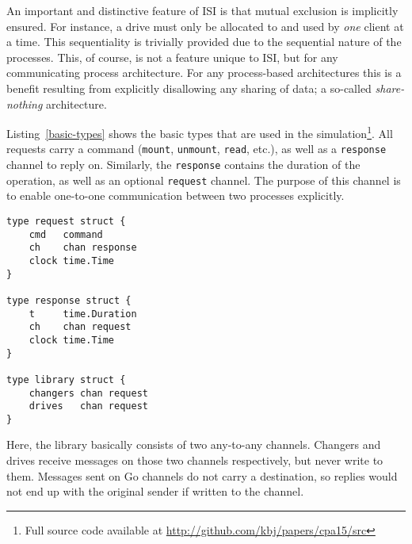 An important and distinctive feature of ISI is that mutual exclusion is
implicitly ensured. For instance, a drive must only be allocated to and used by
\emph{one} client at a time. This sequentiality is trivially provided due to
the sequential nature of the processes. This, of course, is not a feature
unique to ISI, but for any communicating process architecture. For any
process-based architectures this is a benefit resulting from explicitly
disallowing any sharing of data; a so-called
\emph{share-nothing} architecture.



Listing~\ref{basic-types} shows the basic types that are used in the
simulation\footnote{Full source code available at
\url{http://github.com/kbj/papers/cpa15/src}}. All requests carry a command
(\verb|mount|,
\verb|unmount|, \verb|read|, etc.), as well as a \verb|response|
channel to reply on. Similarly, the \verb|response| contains the duration
of the operation, as well as an optional \verb|request| channel. The
purpose of this channel is to	enable one-to-one communication between two
processes explicitly.

\begin{lstlisting}[caption={Basic types for tape simulation}, label=basic-types]
type request struct {
    cmd   command
    ch    chan response
    clock time.Time
}

type response struct {
    t     time.Duration
    ch    chan request
    clock time.Time
}

type library struct {
    changers chan request
    drives   chan request
}
\end{lstlisting}

Here, the library basically consists of two any-to-any channels. Changers and
drives receive messages on those two channels respectively, but never write to
them. Messages sent on Go channels do not carry a destination, so replies would
not end up with the original sender if written to the channel.


